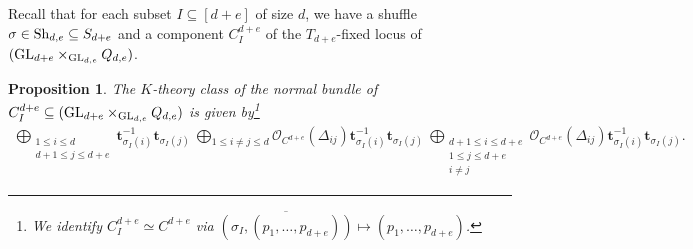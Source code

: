 \documentclass[10pt]{amsart}
\newcommand{\bt}{\mathbf{t}}
\newcommand{\+}{{}^+}
\newcommand{\GL}{\textnormal{GL}}
\newcommand{\Sh}{\textnormal{Sh}}
\newtheorem {proposition}[theorem]{Proposition}
\theoremstyle{definition}
\theoremstyle {definition}
\theoremstyle {definition}
\begin{document}
Recall that for each subset $I\subseteq [d+e]$ of size $d$, we have a shuffle $\sigma\in \Sh_{d,e}\subseteq S_{d+e}$ and a component $C^{d+e}_I$ of the $T_{d+e}$-fixed locus of $(\GL_{d+e}\times_{\GL_{d,e}} Q_{d,e})$.

\begin{proposition} \label{prop: normalbundleext}
    The $K$-theory class of the normal bundle 
    of $C^{d+e}_I\subseteq (\GL_{d+e}\times_{\GL_{d,e}} Q_{d,e})$ is given by\footnote{We identify $C^{d+e}_I\simeq C^{d+e}$ via $\overline{(\sigma_I, (p_1,\dots,p_{d+e}))}\mapsto (p_1,\dots,p_{d+e})$.} 
\begin{align*}
\bigoplus_{\substack{1 \leq i \leq d \\ d+1 \leq j \leq d+e}} \bt_{\sigma_I(i)}^{-1}\bt_{\sigma_I(j)}  \ \bigoplus_{1 \leq i \neq j \leq d} \mathcal{O}_{C^{d+e}}(\Delta_{ij})\bt_{\sigma_I(i)}^{-1}\bt_{\sigma_I(j)} \ \bigoplus_{\substack{d+1 \leq i \leq d+e \\ 1 \leq j \leq d+e\\ i\neq j}} \mathcal{O}_{C^{d+e}}(\Delta_{ij}) \bt_{\sigma_I(i)}^{-1}\bt_{\sigma_I(j)}.  
\end{align*}

\end{proposition}
\end{document}

